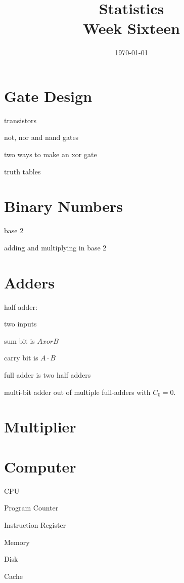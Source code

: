 \documentclass[landscape]{exam}
\title{Statistics \\ Week Sixteen}
\date{\today}
\author{}
\begin{document}
  \maketitle
  \tableofcontents

  \section{Gate Design}
  \begin{itemize*}
    \item transistors
    \item not, nor and nand gates
    \item two ways to make an xor gate
    \item truth tables
  \end{itemize*}

  \section{Binary Numbers}
  \begin{itemize*}
    \item base 2 
    \item adding and multiplying in base 2
  \end{itemize*}

  \section{Adders}

  half adder:
  \begin{itemize*}
    \item two inputs
    \item sum bit is $A xor B$
    \item carry bit is $A \cdot B$
  \end{itemize*}

  full adder is two half adders

  multi-bit adder out of multiple full-adders with $C_0 = 0$.

  \section{Multiplier}

  \section{Computer}
  \begin{itemize*}
    \item CPU
    \item Program Counter
    \item Instruction Register
    \item Memory
    \item Disk
    \item Cache
  \end{itemize*}
\end{document}
